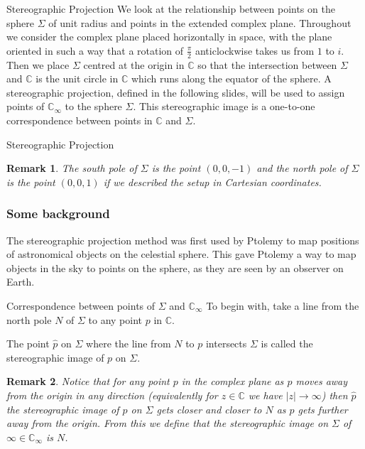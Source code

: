 \documentclass{beamer}
\newtheorem*{remark}{Remark}
\begin{document}
\begin{frame}{Stereographic Projection}
We look at the relationship between points on the sphere $\Sigma$ of unit radius and points in the extended complex plane. 
Throughout we consider the complex plane placed horizontally in space, with the plane oriented in such a way that a rotation of $\frac{\pi}{2}$ anticlockwise takes us from $1$ to $i$. Then we place $\Sigma$ centred at the origin in $\mathbb{C}$ so that the intersection between $\Sigma$ and $\mathbb{C}$ is the unit circle in $\mathbb{C}$ which runs along the equator of the sphere. A stereographic projection, defined in the following slides, will be used to assign points of $\mathbb{C}_{\infty}$ to the sphere $\Sigma$. This stereographic image is a one-to-one correspondence between points in $\mathbb{C}$ and $\Sigma$. 
\end{frame} 

\begin{frame}{Stereographic Projection}
\begin{remark}
The south pole of $\Sigma$ is the point $(0,0,-1)$ and the north pole of $\Sigma$ is the point $(0,0,1)$ if we described the setup in Cartesian coordinates.
\end{remark}

\subsubsection{Some background}
The stereographic projection method was first used by Ptolemy to map positions of astronomical objects on the celestial sphere.  This gave Ptolemy a way to map objects in the sky to points on the sphere, as they are seen by an observer on Earth.
\end{frame}

\begin{frame}{Correspondence between points of $\Sigma$ and $\mathbb{C}_{\infty}$}
To begin with, take a line from the north pole $N$ of $\Sigma$ to any point $p$ in $\mathbb{C}$. 
\begin{definition}
The point $\hat{p}$ on $\Sigma$ where the line from $N$ to $p$ intersects $\Sigma$ is called the stereographic image of $p$ on $\Sigma$. 
\end{definition}

\begin{remark}
Notice that for any point $p$ in the complex plane as $p$ moves away from the origin in any direction (equivalently for $z\in\mathbb{C}$ we have $|z|\to\infty$) then $\hat{p}$ the stereographic image of $p$ on $\Sigma$ gets closer and closer to $N$ as $p$ gets further away from the origin. From this we define that the stereographic image on $\Sigma$ of $\infty\in\mathbb{C}_{\infty}$ is $N$.
\end{remark}
\end{frame}
\end{document}
